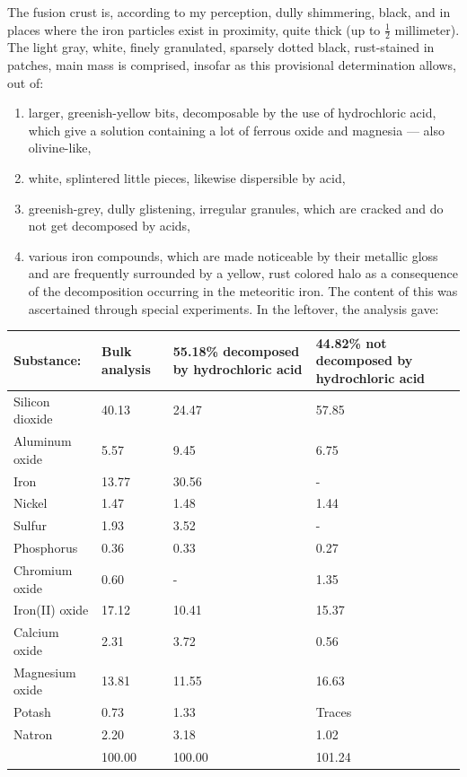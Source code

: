 \documentclass[a4paper, 12pt, oneside]{article}
\begin{document}
The fusion crust is, according to my perception, dully shimmering, black, and in places where the iron particles exist in proximity, quite thick (up to $\frac{1}{2}$ millimeter). The light gray, white, finely granulated, sparsely dotted black, rust-stained in patches, main mass is comprised, insofar as this provisional determination allows, out of:
\begin{enumerate}
    \item larger, greenish-yellow bits, decomposable by the use of hydrochloric acid, which give a solution containing a lot of ferrous oxide and magnesia --- also olivine-like,
    \item white, splintered little pieces, likewise dispersible by acid,
    \item greenish-grey, dully glistening, irregular granules, which are cracked and do not get decomposed by acids,
    \item various iron compounds, which are made noticeable by their metallic gloss and are frequently surrounded by a yellow, rust colored halo as a consequence of the decomposition occurring in the meteoritic iron. The content of this was ascertained through special experiments. In the leftover, the analysis gave:
\end{enumerate}
\begin{center}
    \tiny
    \begin{tabular}{ |l|p{1.5cm}|p{1.5cm}|p{1.5cm}| }
        \hline
        Substance: & Bulk analysis & 55.18\% decomposed by hydrochloric acid & 44.82\% not decomposed by hydrochloric acid\\\hline
        Silicon dioxide & 40.13 & 24.47 & 57.85\\\hline
        Aluminum oxide & 5.57 & 9.45 & 6.75\\\hline
        Iron & 13.77 & 30.56 & -\\\hline
        Nickel & 1.47 & 1.48 & 1.44\\\hline
        Sulfur & 1.93 & 3.52 & -\\\hline
        Phosphorus & 0.36 & 0.33 & 0.27\\\hline
        Chromium oxide & 0.60 & - & 1.35\\\hline
        Iron(II) oxide & 17.12 & 10.41 & 15.37\\\hline
        Calcium oxide & 2.31 & 3.72 & 0.56\\\hline
        Magnesium oxide & 13.81 & 11.55 & 16.63\\\hline
        Potash & 0.73 & 1.33 & Traces\\\hline
        Natron & 2.20 & 3.18 & 1.02\\\hline
        & 100.00 & 100.00 & 101.24\\
        \hline
    \end{tabular}
\end{center}
\end{document}
